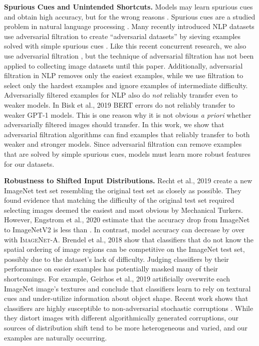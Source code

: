 \documentclass[10pt,twocolumn,letterpaper]{article}
\begin{document}
\noindent\textbf{Spurious Cues and Unintended Shortcuts.} Models may learn spurious cues and obtain high accuracy, but for the wrong reasons \cite{Lapuschkin2019UnmaskingCH,Geirhos2020ShortcutLI}. Spurious cues are a studied problem in natural language processing \cite{Cai2017PayAT,Gururangan2018AnnotationAI}. Many recently introduced NLP datasets use adversarial filtration to create ``adversarial datasets'' by sieving examples solved with simple spurious cues \cite{Sakaguchi2019WINOGRANDEAA,Bhagavatula2019AbductiveCR,Zellers2019HellaSwagCA,Dua2019DROPAR,Bisk2020PIQARA,Hendrycks2020AligningAW}. Like this recent concurrent research, we also use adversarial filtration \cite{Sung1995LearningAE}, but the technique of adversarial filtration has not been applied to collecting image datasets until this paper. Additionally, adversarial filtration in NLP removes only the easiest examples, while we use filtration to select only the hardest examples and ignore examples of intermediate difficulty.
Adversarially filtered examples for NLP also do \emph{not} reliably transfer even to weaker models. In Bisk et al., 2019 \cite{Bisk2019PIQARA} BERT errors do not reliably transfer to weaker GPT-1 models. This is one reason why it is not obvious \emph{a priori} whether adversarially filtered images should transfer. In this work, we show that adversarial filtration algorithms can find examples that reliably transfer to both weaker and stronger models. Since adversarial filtration can remove examples that are solved by simple spurious cues, models must learn more robust features for our datasets. 

\noindent\textbf{Robustness to Shifted Input Distributions.}\quad 
Recht et al., 2019 \cite{Recht2019DoIC} create a new ImageNet test set resembling the original test set as closely as possible. 
They found evidence that matching the difficulty of the original test set required selecting images deemed the easiest and most obvious by Mechanical Turkers. However, Engstrom et al., 2020 \cite{Engstrom2020IdentifyingSB} estimate that the accuracy drop from ImageNet to ImageNetV2 is less than .
In contrast, model accuracy can decrease by over  with \textsc{ImageNet-A}. Brendel et al., 2018 \cite{Brendel2018ApproximatingCW} show that classifiers that do not know the spatial ordering of image regions can be competitive on the ImageNet test set, possibly due to the dataset's lack of difficulty. Judging classifiers by their performance on easier examples has potentially masked many of their shortcomings. For example, Geirhos et al., 2019 \cite{geirhos2019} artificially overwrite each ImageNet image's textures and conclude that classifiers learn to rely on textural cues and under-utilize information about object shape. Recent work shows that classifiers are highly susceptible to non-adversarial stochastic corruptions \cite{hendrycks2019robustness}. While they distort images with  different algorithmically generated corruptions, our sources of distribution shift tend to be more heterogeneous and varied, and our examples are naturally occurring.
\end{document}
